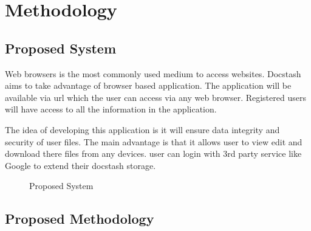 \chapter{Methodology}
\newpage
\section{Proposed System}

\hspace{0.6cm}Web browsers is the most commonly used medium to access websites. Docstash aims to take advantage of browser based application. The application will be available via url which the user can access via any web browser. Registered users will have access to all the information in the application.

\vspace{0.2cm}The idea of developing this application is it will ensure data integrity and security of user files. The main advantage is that it allows user to view edit and download there files from any devices. user can login with 3rd party service like Google to extend their docstash storage.


\begin{figure}[h]
\begin{center}
    \caption{Proposed System}
    \label{5}
\end{center}
\end{figure}

\section{Proposed Methodology}


